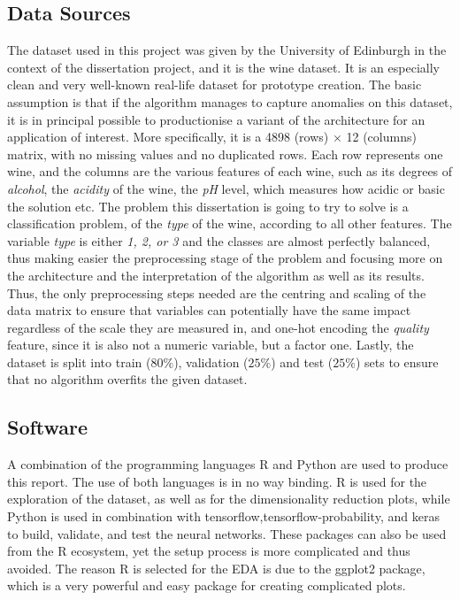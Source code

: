 \documentclass[11pt,twoside]{article}
\numberwithin{Theorem}{section}
\numberwithin{Definition}{section}
\numberwithin{Lemma}{section}
\numberwithin{Algorithm}{section}
\numberwithin{equation}{section}
\begin{document}
\subsection{Data Sources}
\label{sec:back}
The dataset used in this project was given by the University of Edinburgh in the context of the dissertation project, and it is the wine dataset. It is an especially clean and very well-known real-life dataset for prototype creation. The basic assumption is that if the algorithm manages to capture anomalies on this dataset, it is in principal possible to productionise a variant of the architecture for an application of interest. More specifically, it is a 4898 (rows) $\times$ 12 (columns) matrix, with no missing values and no duplicated rows. Each row represents one wine, and the columns are the various features of each wine, such as its degrees of \textit{alcohol}, the \textit{acidity} of the wine, the \textit{pH} level, which measures how acidic or basic the solution etc. The problem this dissertation is going to try to solve is a classification problem, of the \textit{type} of the wine, according to all other features. The variable \textit{type} is either \textit{1, 2, or 3} and the classes are almost perfectly balanced, thus making easier the preprocessing stage of the problem and focusing more on the architecture and the interpretation of the algorithm as well as its results. Thus, the only preprocessing steps needed are the centring and scaling of the data matrix to ensure that variables can potentially have the same impact regardless of the scale they are measured in, and one-hot encoding the \textit{quality} feature, since it is also not a numeric variable, but a factor one. Lastly, the dataset is split into train ($80\%$), validation ($25\%$) and test ($25\%$) sets to ensure that no algorithm overfits the given dataset.
\subsection{Software}
\label{sec:software}
A combination of the programming languages \textsf{R} and \textsf{Python} are used to produce this report. The use of both languages is in no way binding. \textsf{R} is used for the exploration of the dataset, as well as for the dimensionality reduction plots, while \textsf{Python} is used in combination with \textsf{tensorflow},\textsf{tensorflow-probability}, and \textsf{keras} to build, validate, and test the neural networks. These packages can also be used from the \textsf{R} ecosystem, yet the setup process is more complicated and thus avoided. The reason \textsf{R} is selected for the EDA is due to the \textsf{ggplot2} package, which is a very powerful and easy package for creating complicated plots. 
\clearpage
\end{document}
